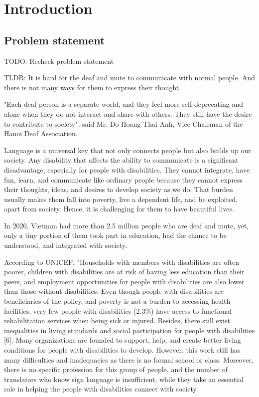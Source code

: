\chapter{Introduction}
	
\section{Problem statement}

TODO: Recheck problem statement

TLDR: It is hard for the deaf and mute to communicate with normal people. And there is not many ways for them to express their thought.

"Each deaf person is a separate world, and they feel more self-deprecating and alone when they do not interact and share with others. They still have the desire to contribute to society", said Mr. Do Hoang Thai Anh, Vice Chairman of the Hanoi Deaf Association.

Language is a universal key that not only connects people but also builds up our society. Any disability that affects the ability to communicate is a significant disadvantage, especially for people with disabilities. They cannot integrate, have fun, learn, and communicate like ordinary people because they cannot express their thoughts, ideas, and desires to develop society as we do. That burden usually makes them fall into poverty, live a dependent life, and be exploited, apart from society. Hence, it is challenging for them to have beautiful lives.

In 2020, Vietnam had more than 2.5 million people who are deaf and mute, yet, only a tiny portion of them took part in education, had the chance to be understood, and integrated with society.

According to UNICEF, "Households with members with disabilities are often poorer, children with disabilities are at risk of having less education than their peers, and employment opportunities for people with disabilities are also lower than those without disabilities. Even though people with disabilities are beneficiaries of the policy, and poverty is not a burden to accessing health facilities, very few people with disabilities (2.3\%) have access to functional rehabilitation services when being sick or injured. Besides, there still exist inequalities in living standards and social participation for people with disabilities [6]. Many organizations are founded to support, help, and create better living conditions for people with disabilities to develop. However, this work still has many difficulties and inadequacies as there is no formal school or class. Moreover, there is no specific profession for this group of people, and the number of translators who know sign language is insufficient, while they take an essential role in helping the people with disabilities connect with society.

